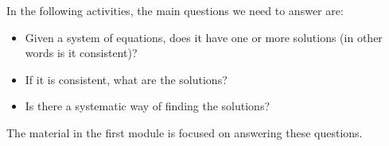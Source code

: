 \documentclass{ximera}
\begin{document}
In the following activities, the main questions we need to answer are:
\begin{itemize}
\item Given a system of equations, does it have one or more solutions (in other words is it consistent)?
\item If it is consistent, what are the solutions?
\item Is there a systematic way of finding the solutions?
\end{itemize}

The material in the first module is focused on answering these questions.
\end{document}
